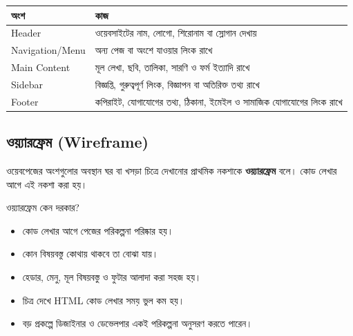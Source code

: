 \begin{center}
\begin{tabular}{|p{}|p{}|}
\hline
\textbf{অংশ} & \textbf{কাজ} \\
\hline
Header & ওয়েবসাইটের নাম, লোগো, শিরোনাম বা স্লোগান দেখায় \\
\hline
Navigation/Menu & অন্য পেজ বা অংশে যাওয়ার লিংক রাখে \\
\hline
Main Content & মূল লেখা, ছবি, তালিকা, সারণি ও ফর্ম ইত্যাদি রাখে \\
\hline
Sidebar & বিজ্ঞপ্তি, গুরুত্বপূর্ণ লিংক, বিজ্ঞাপন বা অতিরিক্ত তথ্য রাখে \\
\hline
Footer & কপিরাইট, যোগাযোগের তথ্য, ঠিকানা, ইমেইল ও সামাজিক যোগাযোগের লিংক রাখে \\
\hline
\end{tabular}
\end{center}

\subsection{ওয়্যারফ্রেম (Wireframe)}

\begin{definitionbox}{}
ওয়েবপেজের অংশগুলোর অবস্থান ঘর বা খসড়া চিত্রে দেখানোর প্রাথমিক নকশাকে \textbf{ওয়্যারফ্রেম} বলে। কোড লেখার আগে এই নকশা করা হয়।
\end{definitionbox}

\begin{center}
\end{center}

\begin{keypointbox}{ওয়্যারফ্রেম কেন দরকার?}
\begin{itemize}
\item কোড লেখার আগে পেজের পরিকল্পনা পরিষ্কার হয়।
\item কোন বিষয়বস্তু কোথায় থাকবে তা বোঝা যায়।
\item হেডার, মেনু, মূল বিষয়বস্তু ও ফুটার আলাদা করা সহজ হয়।
\item চিত্র দেখে HTML কোড লেখার সময় ভুল কম হয়।
\item বড় প্রকল্পে ডিজাইনার ও ডেভেলপার একই পরিকল্পনা অনুসরণ করতে পারেন।
\end{itemize}
\end{keypointbox}

